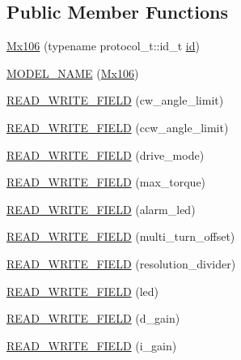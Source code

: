 \subsection*{Public Member Functions}
\begin{DoxyCompactItemize}
\item 
\hyperlink{classdynamixel_1_1servos_1_1_mx106_a184741dcdff7d84954ade3e11991950d}{Mx106} (typename protocol\+\_\+t\+::id\+\_\+t \hyperlink{classdynamixel_1_1servos_1_1_servo_a2d022081672e25a7bb57b76706e1cc57}{id})
\item 
\hyperlink{classdynamixel_1_1servos_1_1_mx106_a62132a7010a8803253cd6733c2a4c348}{M\+O\+D\+E\+L\+\_\+\+N\+A\+ME} (\hyperlink{classdynamixel_1_1servos_1_1_mx106}{Mx106})
\item 
\hyperlink{classdynamixel_1_1servos_1_1_mx106_a51923345707aaaf521c92db51b046ad3}{R\+E\+A\+D\+\_\+\+W\+R\+I\+T\+E\+\_\+\+F\+I\+E\+LD} (cw\+\_\+angle\+\_\+limit)
\item 
\hyperlink{classdynamixel_1_1servos_1_1_mx106_a0ff6915f624e389fb1084d510b127f89}{R\+E\+A\+D\+\_\+\+W\+R\+I\+T\+E\+\_\+\+F\+I\+E\+LD} (ccw\+\_\+angle\+\_\+limit)
\item 
\hyperlink{classdynamixel_1_1servos_1_1_mx106_a9832c95a40e9f62debd1e3b7af152ea7}{R\+E\+A\+D\+\_\+\+W\+R\+I\+T\+E\+\_\+\+F\+I\+E\+LD} (drive\+\_\+mode)
\item 
\hyperlink{classdynamixel_1_1servos_1_1_mx106_acb865eeab49a936e12f4fc7860f5bc56}{R\+E\+A\+D\+\_\+\+W\+R\+I\+T\+E\+\_\+\+F\+I\+E\+LD} (max\+\_\+torque)
\item 
\hyperlink{classdynamixel_1_1servos_1_1_mx106_a5449c62f52d39a641bef1ed2595aa4e6}{R\+E\+A\+D\+\_\+\+W\+R\+I\+T\+E\+\_\+\+F\+I\+E\+LD} (alarm\+\_\+led)
\item 
\hyperlink{classdynamixel_1_1servos_1_1_mx106_ac6664ff789a4d28db9e0a9e3370c1670}{R\+E\+A\+D\+\_\+\+W\+R\+I\+T\+E\+\_\+\+F\+I\+E\+LD} (multi\+\_\+turn\+\_\+offset)
\item 
\hyperlink{classdynamixel_1_1servos_1_1_mx106_a0346932faf6dfd8f3a9598c5966560f9}{R\+E\+A\+D\+\_\+\+W\+R\+I\+T\+E\+\_\+\+F\+I\+E\+LD} (resolution\+\_\+divider)
\item 
\hyperlink{classdynamixel_1_1servos_1_1_mx106_a90c9736060b38f693e8b3c5c7078decd}{R\+E\+A\+D\+\_\+\+W\+R\+I\+T\+E\+\_\+\+F\+I\+E\+LD} (led)
\item 
\hyperlink{classdynamixel_1_1servos_1_1_mx106_a04f540f8b24808e523c0f9b4159f3ee6}{R\+E\+A\+D\+\_\+\+W\+R\+I\+T\+E\+\_\+\+F\+I\+E\+LD} (d\+\_\+gain)
\item 
\hyperlink{classdynamixel_1_1servos_1_1_mx106_ad9df6d41f53cc1135e7867bc08717a14}{R\+E\+A\+D\+\_\+\+W\+R\+I\+T\+E\+\_\+\+F\+I\+E\+LD} (i\+\_\+gain)

\end{DoxyCompactItemize}
